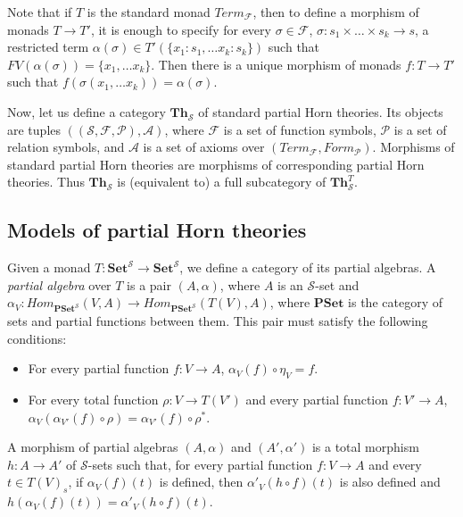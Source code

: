 \documentclass[reqno]{amsart}
\theoremstyle{definition}
\theoremstyle{remark}
\newcommand{\cat}[1]{\mathbf{#1}}
\newcommand{\Set}{\cat{Set}}
\newcommand{\PSet}{\cat{PSet}}
\newcommand{\Th}{\cat{Th}}
\numberwithin{figure}{section}
\begin{document}
Note that if $T$ is the standard monad $Term_\mathcal{F}$, then to define a morphism of monads $T \to T'$,
it is enough to specify for every $\sigma \in \mathcal{F}$, $\sigma : s_1 \times \ldots \times s_k \to s$,
a restricted term $\alpha(\sigma) \in T'(\{ x_1 : s_1, \ldots x_k : s_k \})$ such that $FV(\alpha(\sigma)) = \{ x_1, \ldots x_k \}$.
Then there is a unique morphism of monads $f : T \to T'$ such that $f(\sigma(x_1, \ldots x_k)) = \alpha(\sigma)$.

Now, let us define a category $\Th_\mathcal{S}$ of standard partial Horn theories.
Its objects are tuples $((\mathcal{S},\mathcal{F},\mathcal{P}),\mathcal{A})$, where $\mathcal{F}$ is a set of function symbols,
    $\mathcal{P}$ is a set of relation symbols, and $\mathcal{A}$ is a set of axioms over $(Term_\mathcal{F},Form_\mathcal{P})$.
Morphisms of standard partial Horn theories are morphisms of corresponding partial Horn theories.
Thus $\Th_\mathcal{S}$ is (equivalent to) a full subcategory of $\Th^T_\mathcal{S}$.

\subsection{Models of partial Horn theories}

Given a monad $T : \Set^\mathcal{S} \to \Set^\mathcal{S}$, we define a category of its partial algebras.
A \emph{partial algebra} over $T$ is a pair $(A,\alpha)$, where $A$ is an $\mathcal{S}$-set and $\alpha_V : Hom_{\PSet^\mathcal{S}}(V,A) \to Hom_{\PSet^\mathcal{S}}(T(V),A)$,
    where $\PSet$ is the category of sets and partial functions between them.
This pair must satisfy the following conditions:
\begin{itemize}
\item For every partial function $f : V \to A$, $\alpha_V(f) \circ \eta_V = f$.
\item For every total function $\rho : V \to T(V')$ and every partial function $f : V' \to A$, $\alpha_V(\alpha_{V'}(f) \circ \rho) = \alpha_{V'}(f) \circ \rho^*$.
\end{itemize}
A morphism of partial algebras $(A,\alpha)$ and $(A',\alpha')$ is a total morphism $h : A \to A'$ of $\mathcal{S}$-sets
    such that, for every partial function $f : V \to A$ and every $t \in T(V)_s$, if $\alpha_V(f)(t)$ is defined,
    then $\alpha'_V(h \circ f)(t)$ is also defined and $h(\alpha_V(f)(t)) = \alpha'_V(h \circ f)(t)$.
\end{document}

